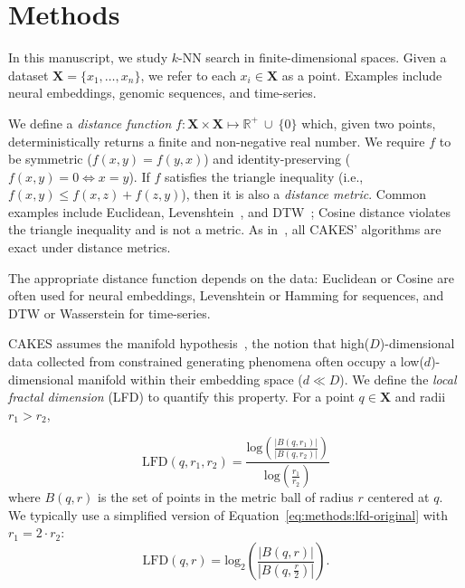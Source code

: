 \section{Methods}
\label{sec:methods}

In this manuscript, we study $k$-NN search in finite-dimensional spaces.
Given a dataset $\textbf{X} = \{x_1, \dots, x_n\}$, we refer to each $x_i \in \textbf{X}$ as a point.
Examples include neural embeddings, genomic sequences, and time-series.

We define a \textit{distance function} $f : \textbf{X} \times \textbf{X} \mapsto \mathbb{R}^+ \ \cup \ \{0\}$ which, given two points, deterministically returns a finite and non-negative real number.
We require $f$ to be symmetric ($f(x, y) = f(y, x)$) and identity-preserving ($f(x, y) = 0 \iff x = y$). 
If $f$ satisfies the triangle inequality (i.e.,\,$f(x, y) \leq f(x, z) + f(z, y)$), then it is also a \textit{distance metric}.
Common examples include Euclidean, Levenshtein~\cite{levenshtein1966binary}, and DTW~\cite{muller2007dynamic};
Cosine distance violates the triangle inequality and is not a metric.
As in~\cite{yu2015entropy}, all CAKES' algorithms are exact under distance metrics.


The appropriate distance function depends on the data: Euclidean or Cosine are often used for neural embeddings, Levenshtein or Hamming for sequences, and DTW or Wasserstein for time-series.

CAKES assumes the manifold hypothesis~\cite{fefferman2016testing}, the notion that high($D$)-dimensional data collected from constrained generating phenomena often occupy a low($d$)-dimensional manifold within their embedding space ($d \ll D$).
We define the \emph{local fractal dimension} (LFD) to quantify this property.
For a point $q \in \textbf{X}$ and radii $r_1 > r_2$,

\begin{equation}
    \text{LFD}(q, r_1, r_2) = \frac{\text{log} \left( \frac{|B(q, r_1)|}{|B(q, r_2)|} \right) }{\text{log} \left( \frac{r_1}{r_2} \right) }
    \label{eq:methods:lfd-original}
\end{equation}
where $B(q, r)$ is the set of points in the metric ball of radius $r$ centered at $q$.
We typically use a simplified version of Equation~\ref{eq:methods:lfd-original} with $r_1 = 2 \cdot r_2$:
\begin{equation}
    \text{LFD}(q, r) = \text{log}_2 \left( \frac{|B(q, r)|}{|B(q, \frac{r}{2})|} \right).
    \label{eq:methods:lfd-half}
\end{equation}

